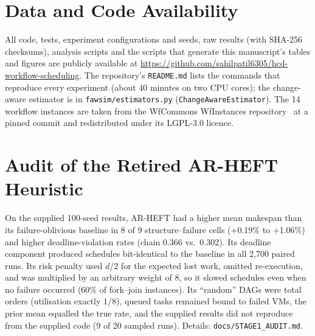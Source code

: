 \documentclass[conference]{IEEEtran}
\begin{document}
\section*{Data and Code Availability}
All code, tests, experiment configurations and seeds, raw results (with SHA-256 checksums), analysis scripts and the scripts
that generate this manuscript's tables and figures are publicly available at
\url{https://github.com/sahilpatil6305/hcd-workflow-scheduling}. The repository's \texttt{README.md} lists the commands that
reproduce every experiment (about 40 minutes on two CPU cores); the change-aware estimator is in
\texttt{fawsim/estimators.py} (\texttt{ChangeAwareEstimator}). The 14 workflow instances are taken from the WfCommons
WfInstances repository~\cite{coleman2022wfcommons} at a pinned commit and redistributed under its LGPL-3.0 licence.




\appendices
\section{Audit of the Retired AR-HEFT Heuristic}\label{app:audit}
On the supplied 100-seed results, AR-HEFT had a higher mean makespan than its failure-oblivious baseline in 8 of 9
structure--failure cells (+0.19\% to +1.06\%) and higher deadline-violation rates (chain 0.366 vs.\ 0.302). Its deadline
component produced schedules bit-identical to the baseline in all 2,700 paired runs. Its risk penalty used $d/2$ for the
expected lost work, omitted re-execution, and was multiplied by an arbitrary weight of 8, so it slowed schedules even
when no failure occurred (60\% of fork--join instances). Its ``random'' DAGs were total orders (utilisation exactly $1/8$),
queued tasks remained bound to failed VMs, the prior mean equalled the true rate, and the supplied results did not reproduce
from the supplied code (9 of 20 sampled runs). Details: \texttt{docs/STAGE1\_AUDIT.md}.
\end{document}
